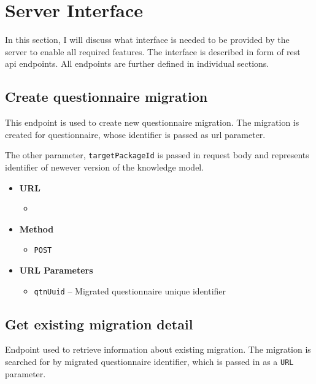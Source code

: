 \section{Server Interface}\label{sec:server-interface}

In this section, I will discuss what interface is needed to be provided by the server to enable all required features.
The interface is described in form of \gls{rest} \gls{api} endpoints.
All endpoints are further defined in individual sections.

\subsection{Create questionnaire migration}

This endpoint is used to create new questionnaire migration.
The migration is created for questionnaire, whose identifier is passed as \gls{url} parameter.

The other parameter, \texttt{targetPackageId} is passed in request body and represents identifier of newever version of the knowledge model.

\begin{itemize}
    \item \textbf{URL}
        \begin{itemize}
            \item {}
        \end{itemize}

    \item \textbf{Method}
        \begin{itemize}
            \item \texttt{POST}
        \end{itemize}

    \item \textbf{URL Parameters}
        \begin{itemize}
            \item \texttt{qtnUuid} -- Migrated questionnaire unique identifier
        \end{itemize}
\end{itemize}

\subsection{Get existing migration detail}

Endpoint used to retrieve information about existing migration.
The migration is searched for by migrated questionnaire identifier, which is passed in as a \texttt{URL} parameter.

